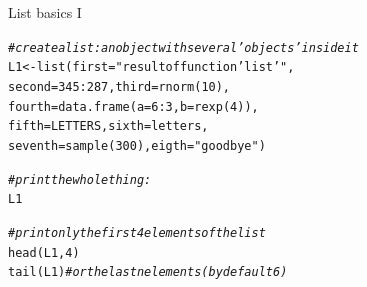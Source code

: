 \documentclass[xcolor=table,           xcolor=dvipsnames]{beamer}\usepackage[]{graphicx}\usepackage[]{color}
\makeatletter
\newcommand{\hlnum}[1]{\textcolor[rgb]{0,0,0}{#1}}
\newcommand{\hlstr}[1]{\textcolor[rgb]{0.545,0.137,0.137}{#1}}
\newcommand{\hlcom}[1]{\textcolor[rgb]{0,0.392,0}{\textit{#1}}}
\newcommand{\hlopt}[1]{\textcolor[rgb]{0,0,0}{#1}}
\newcommand{\hlstd}[1]{\textcolor[rgb]{0,0,0}{#1}}
\newcommand{\hlkwb}[1]{\textcolor[rgb]{0,0,0}{#1}}
\newcommand{\hlkwc}[1]{\textcolor[rgb]{1,0,1}{#1}}
\newcommand{\hlkwd}[1]{\textcolor[rgb]{0,0,1}{#1}}
\newenvironment{kframe}{%
 \def\at@end@of@kframe{}%
 \ifinner\ifhmode%
  \def\at@end@of@kframe{\end{minipage}}%
  \begin{minipage}{\columnwidth}%
 \fi\fi%
 \def\FrameCommand##1{\hskip\@totalleftmargin \hskip-\fboxsep
 \colorbox{shadecolor}{##1}\hskip-\fboxsep
     \hskip-\linewidth \hskip-\@totalleftmargin \hskip\columnwidth}%
 \MakeFramed {\advance\hsize-\width
   \@totalleftmargin\z@ \linewidth\hsize
   \@setminipage}}%
 {\par\unskip\endMakeFramed%
 \at@end@of@kframe}
\newenvironment{knitrout}{}{} %
\makeatother
\begin{document}
\begin{frame}[fragile]{List basics I}
\begin{knitrout}
\color{fgcolor}\begin{kframe}
\begin{alltt}
\hlcom{# create a list: an object with several 'objects' inside it}
\hlstd{L1} \hlkwb{<-} \hlkwd{list}\hlstd{(}\hlkwc{first}\hlstd{=}\hlstr{"result of function 'list'"}\hlstd{,}
           \hlkwc{second}\hlstd{=}\hlnum{345}\hlopt{:}\hlnum{287}\hlstd{,} \hlkwc{third}\hlstd{=}\hlkwd{rnorm}\hlstd{(}\hlnum{10}\hlstd{),}
           \hlkwc{fourth}\hlstd{=}\hlkwd{data.frame}\hlstd{(}\hlkwc{a}\hlstd{=}\hlnum{6}\hlopt{:}\hlnum{3}\hlstd{,} \hlkwc{b}\hlstd{=}\hlkwd{rexp}\hlstd{(}\hlnum{4}\hlstd{)),}
           \hlkwc{fifth}\hlstd{=LETTERS,} \hlkwc{sixth}\hlstd{=letters,}
           \hlkwc{seventh}\hlstd{=}\hlkwd{sample}\hlstd{(}\hlnum{300}\hlstd{),} \hlkwc{eigth}\hlstd{=}\hlstr{"goodbye"}\hlstd{)}
\end{alltt}
\end{kframe}
\end{knitrout}
\pause
\begin{knitrout}
\color{fgcolor}\begin{kframe}
\begin{alltt}
\hlcom{# print the whole thing:}
\hlstd{L1}
\end{alltt}
\end{kframe}
\end{knitrout}
\pause
\begin{knitrout}
\color{fgcolor}\begin{kframe}
\begin{alltt}
\hlcom{# print only the first 4 elements of the list}
\hlkwd{head}\hlstd{(L1,}\hlnum{4}\hlstd{)}
\hlkwd{tail}\hlstd{(L1)} \hlcom{# or the last n elements (by default 6)}
\end{alltt}
\end{kframe}
\end{knitrout}
\end{frame}

\end{document}
